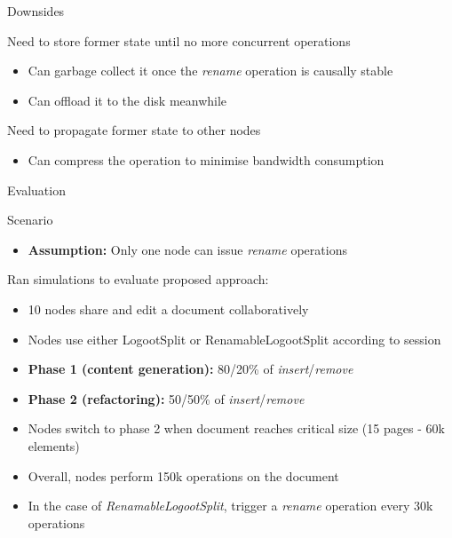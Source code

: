 \documentclass[10pt]{beamer}
\begin{document}
\begin{frame}{Downsides}
  \begin{block}{Need to store former state until no more concurrent operations}

    \pause

    \begin{itemize}
      \item Can garbage collect it once the \emph{rename} operation is causally stable 
      \item Can offload it to the disk meanwhile
    \end{itemize}
  \end{block}

  \pause

  \begin{block}{Need to propagate former state to other nodes}

    \pause

    \begin{itemize}
      \item Can compress the operation to minimise bandwidth consumption
    \end{itemize}
  \end{block}
\end{frame}


\begin{frame}[standout]
  Evaluation
\end{frame}


\begin{frame}{Scenario}
  \begin{itemize}
    \item \textbf{Assumption:} Only one node can issue \emph{rename} operations
  \end{itemize}

  \begin{block}{Ran simulations to evaluate proposed approach:}
    \begin{itemize}
      \item 10 nodes share and edit a document collaboratively
      \item Nodes use either LogootSplit or RenamableLogootSplit according to session
      \pause
      \item \textbf{Phase 1 (content generation):} 80/20\% of \emph{insert}/\emph{remove}
      \item \textbf{Phase 2 (refactoring):} 50/50\% of \emph{insert}/\emph{remove}
      \item Nodes switch to phase 2 when document reaches critical size (15 pages - 60k elements)
      \pause
      \item Overall, nodes perform 150k operations on the document
      \item In the case of \emph{RenamableLogootSplit}, trigger a \emph{rename} operation every 30k operations
    \end{itemize}
  \end{block}
\end{frame}
\end{document}

